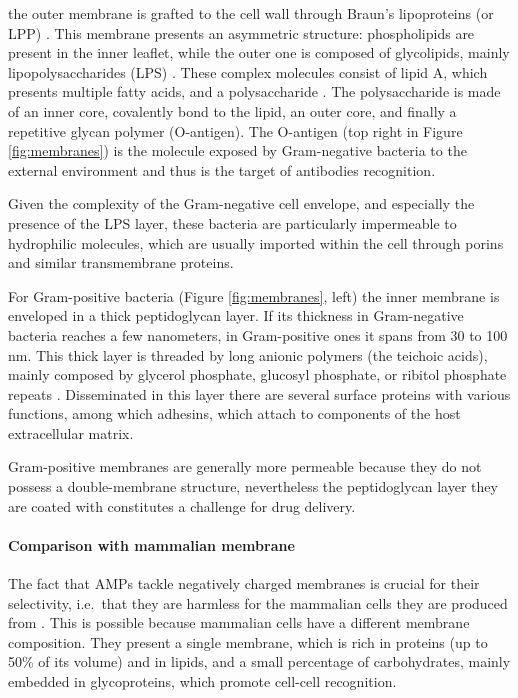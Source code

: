 the outer membrane is grafted to the cell wall through Braun’s lipoproteins (or LPP) \citep{Asmar2018}. This membrane presents an asymmetric structure: phospholipids are present in the inner leaflet, while the outer one is composed of glycolipids, mainly lipopolysaccharides (LPS) \citep{Silhavy2010}. These complex molecules consist of lipid A, which presents multiple fatty acids, and a polysaccharide \citep{Raetz2002}. The polysaccharide is made of an inner core, covalently bond to the lipid, an outer core, and finally a repetitive glycan polymer (O-antigen). The O-antigen (top right in Figure \ref{fig:membranes}) is the molecule exposed by Gram-negative bacteria to the external environment and thus is the target of antibodies recognition.

Given the complexity of the Gram-negative cell envelope, and especially the presence of the LPS layer, these bacteria are particularly impermeable to hydrophilic molecules, which are usually imported within the cell through porins and similar transmembrane proteins.

For Gram-positive bacteria (Figure \ref{fig:membranes}, left) the inner membrane is enveloped in a thick peptidoglycan layer. If its thickness in Gram-negative bacteria reaches a few nanometers, in Gram-positive ones it spans from 30 to 100 nm. This thick layer is threaded by long anionic polymers (the teichoic acids), mainly composed by glycerol phosphate, glucosyl phosphate, or ribitol phosphate repeats \citep{Swoboda2009}. Disseminated in this layer there are several surface proteins with various functions, among which adhesins, which attach to components of the host extracellular matrix.

Gram-positive membranes are generally more permeable because they do not possess a double-membrane structure, nevertheless the peptidoglycan layer they are coated with constitutes a challenge for drug delivery.


\paragraph{Comparison with mammalian membrane}
The fact that AMPs tackle negatively charged membranes is crucial for their selectivity, i.e.\ that they are harmless for the mammalian cells they are produced from \citep{Glukhov2005}. This is possible because mammalian cells have a different membrane composition. They present a single membrane, which is rich in proteins (up to 50\% of its volume) and in lipids, and a small percentage of carbohydrates, mainly embedded in glycoproteins, which promote cell-cell recognition.


